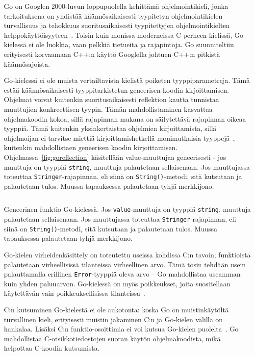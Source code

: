 Go on Googlen 2000-luvun loppupuolella kehittämä ohjelmointikieli, jonka
tarkoituksena on yhdistää käännösaikaisesti tyypitetyn ohjelmointikielen
turvallisuus ja tehokkuus suoritusaikaisesti tyypitettyjen ohjelmointikielten
helppokäyttöisyyteen~\citep{gohistory}. Toisin kuin monissa moderneissa
C-perheen kielissä, Go-kielessä ei ole luokkia, vaan pelkkiä tietueita ja
rajapintoja. Go suunniteltiin erityisesti korvaamaan C++:n käyttö Googlella
johtuen C++:n pitkistä käännösajoista.

Go-kielessä ei ole muista vertailtavista kielistä poiketen tyyppiparametreja.
Tämä estää käännösaikaisesti tyyppitarkistetun geneerisen koodin
kirjoittamisen. Ohjelmat voivat kuitenkin suoritusaikaisesti reflektion kautta
tunnistaa muuttujien konkreettisen tyypin. Tämän mahdollistaminen kasvattaa
ohjelmakoodin kokoa, sillä rajapinnan mukana on säilytettävä rajapinnan oikeaa
tyyppiä. Tämä kuitenkin yksinkertaistaa ohjelmien kirjoittamista, sillä
ohjelmoijan ei tarvitse miettiä kirjoittamishetkellä monimutkaisia
tyyppejä~\citep[esim.][kalvo 8]{gohistory}, kuitenkin mahdollistaen geneerisen
koodin kirjoittamisen. Ohjelmassa~\ref{fig:goreflection} käsitellään
value-muuttujaa geneerisesti - jos muuttuja on tyyppiä \texttt{string},
muuttuja palautetaan sellaisenaan. Jos muuttujassa toteuttaa
\texttt{Stringer}-rajapinnan, eli siinä on \texttt{String()}-metodi, sitä
kutsutaan ja palautetaan tulos. Muussa tapauksessa palautetaan tyhjä
merkkijono.


\begin{listing}[ht!]
    \inputminted{go}{goreflect.go}
    \caption{Geneerinen funktio Go-kielessä. Jos \texttt{value}-muuttuja on
    tyyppiä \texttt{string}, muuttuja palautetaan sellaisenaan. Jos muuttujassa
    toteuttaa \texttt{Stringer}-rajapinnan, eli siinä on
    \texttt{String()}-metodi, sitä kutsutaan ja palautetaan tulos. Muussa
    tapauksessa palautetaan tyhjä merkkijono.}
    \label{fig:goreflection}
\end{listing}


Go-kielen virheidenkäsittely on toteutettu useissa kohdissa C:n tavoin;
funktioista palautetaan virheellisissä tilanteissa virheellinen arvo. Tämä
tosin tehdään usein palauttamalla erillinen \texttt{Error}-tyyppiä oleva arvo
-- Go mahdollistaa useamman kuin yhden paluuarvon. Go-kielessä on myös
poikkeukset, joita suositellaan käytettävän vain poikkeuksellisissa
tilanteissa~\citep{effectivego}.

C:n kutsuminen Go-kielestä ei ole aukotonta: koska Go on muistinkäytöltä
turvallinen kieli, erityisesti muistin jakaminen C:n ja Go-kielen välillä on
hankalaa. Lisäksi C:n funktio-osoittimia ei voi kutsua Go-kielen
puolelta~\citep{cgo}. Go mahdollistaa C-otsikkotiedostojen suoran käytön
ohjelmakoodista, mikä helpottaa C-koodin kutsumista.

